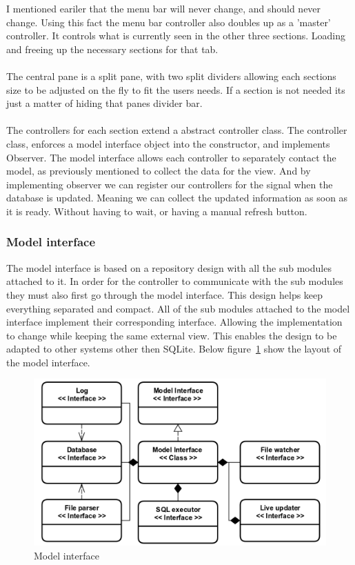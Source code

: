 I mentioned eariler that the menu bar will never change, and should never change. Using this fact the menu bar controller also doubles up as a 'master' controller. It controls what is currently seen in the other three sections. Loading and freeing up the necessary sections for that tab. 
\\\\
The central pane is a split pane, with two split dividers allowing each sections size to be adjusted on the fly to fit the users needs. If a section is not needed its just a matter of hiding that panes divider bar. 
\\\\
The controllers for each section extend a abstract controller class. The controller class, enforces a model interface object into the constructor, and implements Observer. The model interface allows each controller to separately contact the model, as previously mentioned to collect the data for the view. And by implementing observer we can register our controllers for the signal when the database is updated. Meaning we can collect the updated information as soon as it is ready. Without having to wait, or having a manual refresh button.    

\subsubsection{Model interface}
\label{subsubsec:imp_model_interface}

The model interface is based on a repository design with all the sub modules attached to it. In order for the controller to communicate with the sub modules they must also first go through the model interface. This design helps keep everything separated and compact. All of the sub modules attached to the model interface implement their corresponding interface. Allowing the implementation to change while keeping the same external view. This enables the design to be adapted to other systems other then SQLite. Below figure~\ref{fig:model_interface_design} show the layout of the model interface.

\begin{figure}[H]
	\centering
	\includegraphics[scale=0.3]{images/model_interface_design.png}
	\caption{Model interface}
	\label{fig:model_interface_design}
\end{figure}

